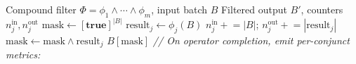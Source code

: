 \begin{algorithm}[H]\small
\caption{Per-Conjunct Operator Instrumentation}
\label{alg:instrument}
\begin{algorithmic}[1]
\Require Compound filter $\Phi = \phi_1 \wedge \cdots \wedge \phi_m$, input batch $B$
\Ensure  Filtered output $B'$, counters $n_j^{\text{in}}, n_j^{\text{out}}$
\State $\text{mask} \leftarrow [\textbf{true}]^{|B|}$
  \State $\text{result}_j \leftarrow \phi_j(B)$
  \State $n_j^{\text{in}} \mathrel{+}= |B|$; \quad $n_j^{\text{out}} \mathrel{+}= |\text{result}_j|$
  \State $\text{mask} \leftarrow \text{mask} \wedge \text{result}_j$
\EndFor
\State \Return $B[\text{mask}]$
\Statex
\Statex \textit{// On operator completion, emit per-conjunct metrics:}
  \State {}
\EndFor
\end{algorithmic}
\end{algorithm}
